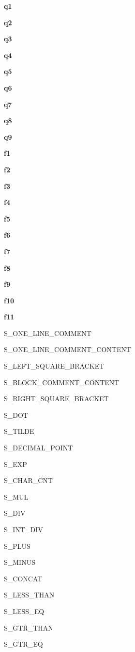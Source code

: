 \documentclass[a4paper, 12pt]{article}
\begin{document}
\begin{itemize}
    \begin{minipage}{0.05\linewidth}   
        \item \textbf{q1}
        \item \textbf{q2}
        \item \textbf{q3}
        \item \textbf{q4}
        \item \textbf{q5}
        \item \textbf{q6}
        \item \textbf{q7}
        \item \textbf{q8}
        \item \textbf{q9}
        \vspace{4cm}
        \item \textbf{f1}
        \item \textbf{f2}
        \item \textbf{f3}
        \item \textbf{f4}
        \item \textbf{f5}
        \item \textbf{f6}
        \item \textbf{f7}
        \item \textbf{f8}
        \item \textbf{f9}
        \item \textbf{f10}
        \item \textbf{f11}
        
    \end{minipage}
    \begin{minipage}{0.55\linewidth}
        \item[] S\_ONE\_LINE\_COMMENT
        \item[] S\_ONE\_LINE\_COMMENT\_CONTENT
        \item[] S\_LEFT\_SQUARE\_BRACKET
        \item[] S\_BLOCK\_COMMENT\_CONTENT
        \item[] S\_RIGHT\_SQUARE\_BRACKET
        \item[] S\_DOT
        \item[] S\_TILDE
        \item[] S\_DECIMAL\_POINT
        \item[] S\_EXP
        \vspace{4cm}
        \item[] S\_CHAR\_CNT
        \item[] S\_MUL
        \item[] S\_DIV
        \item[] S\_INT\_DIV
        \item[] S\_PLUS
        \item[] S\_MINUS
        \item[] S\_CONCAT
        \item[] S\_LESS\_THAN
        \item[] S\_LESS\_EQ
        \item[] S\_GTR\_THAN
        \item[] S\_GTR\_EQ
        

\end{minipage}
\end{itemize}
\end{document}
